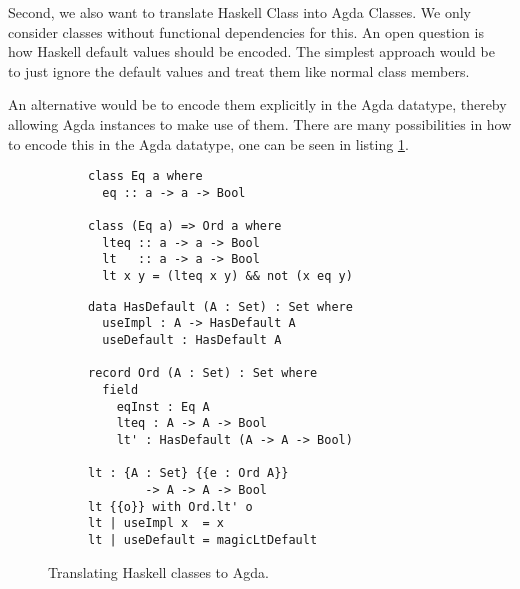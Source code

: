 \documentclass[12pt, a4paper, twoside]{report}
\begin{document}
Second, we also want to translate Haskell Class into Agda Classes. We only
consider classes without functional dependencies for this. An open question is
how Haskell default values should be encoded. The simplest approach would be
to just ignore the default values and treat them like normal class members.

An alternative would be to encode them explicitly in the Agda datatype, thereby
allowing Agda instances to make use of them. There are many possibilities in
how to encode this in the Agda datatype, one can be seen in listing \ref{lst:cls-hs-agda}.
\begin{figure}
\begin{subfigure}[b]{0.5\textwidth}
\begin{lstlisting}
class Eq a where
  eq :: a -> a -> Bool

class (Eq a) => Ord a where
  lteq :: a -> a -> Bool
  lt   :: a -> a -> Bool
  lt x y = (lteq x y) && not (x eq y)
\end{lstlisting}
\end{subfigure}
\hspace{10pt}
\begin{subfigure}[b]{0.5\textwidth}
\begin{lstlisting}
data HasDefault (A : Set) : Set where
  useImpl : A -> HasDefault A
  useDefault : HasDefault A

record Ord (A : Set) : Set where
  field
    eqInst : Eq A
    lteq : A -> A -> Bool
    lt' : HasDefault (A -> A -> Bool)

lt : {A : Set} {{e : Ord A}}
        -> A -> A -> Bool
lt {{o}} with Ord.lt' o
lt | useImpl x  = x
lt | useDefault = magicLtDefault
\end{lstlisting}
\end{subfigure}
\caption{Translating Haskell classes to Agda.}
\label{lst:cls-hs-agda}
\end{figure}
\end{document}
